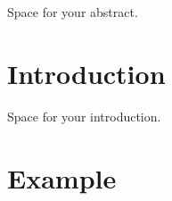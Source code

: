 \documentclass[a4paper,oneside,10pt,ngerman,english]{scrartcl}
\begin{document}



\cleardoubleoddpage


Space for your abstract.




\cleardoubleoddpage

\section{Introduction}
\label{sec:introduction}

Space for your introduction.


\section{Example}
\label{sec:example}
\end{document}

